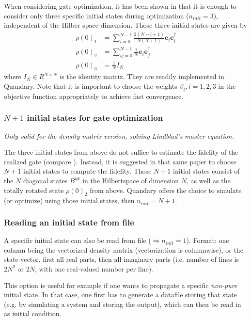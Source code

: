 \documentclass[11pt]{article}
\newcommand{\bs}[1]{{\boldsymbol{#1}}}
\begin{document}
When considering gate optimization, it has been shown in \cite{goerz2014optimal} that it is enough to consider only three specific initial states during optimization ($n_{init}=3$), independent of the Hilber space dimension. Those three initial states are given by
\begin{align}
    \rho(0)_1 &= \sum_{i=0}^{N-1} \frac{2(N-i+1)}{N(N+1)} \bs{e}_i\bs{e}_i^\dagger \\
    \rho(0)_2 &= \sum_{ij=0}^{N-1} \frac{1}{N} \bs{e}_i\bs{e}_j^\dagger\\
    \rho(0)_3 &= \frac{1}{N} I_N
\end{align}
where $I_N\in R^{N\times N}$ is the identity matrix. They are readily implemented in Quandary. Note that it is important to choose the weights $\beta_i, i=1,2,3$ in the objective function appropriately to achieve fast convergence. 

\subsubsection{$N+1$ initial states for gate optimization}
\textit{Only valid for the density matrix version, solving Lindblad's master equation.}


The three initial states from above do not suffice to estimate the fidelity of the realized gate (compare \cite{goerz2014optimal}). Instead, it is suggested in that same paper to choose $N+1$ initial states to compute the fidelity. Those $N+1$ initial states consist of the $N$ diagonal states $B^{kk}$ in the Hilbertspace of dimension $N$, as well as the totally rotated state $\rho(0)_2$ from above. Quandary offers the choice to simulate (or optimize) using those initial states, then $n_{init} = N+1$.

\subsubsection{Reading an initial state from file}
A specific initial state can also be read from file ($\Rightarrow n_{init}=1$). Format: one column being the vectorized density matrix (vectorization is columnwise), or the state vector, first all real parts, then all imaginary parts (i.e. number of lines is $2N^2$ or $2N$, with one real-valued number per line). 

This option is useful for example if one wants to propagate a specific \textit{non-pure} initial state. In that case, one first has to generate a datafile storing that state (e.g. by simulating a system and storing the output), which can then be read in as initial condition. 
\end{document}
